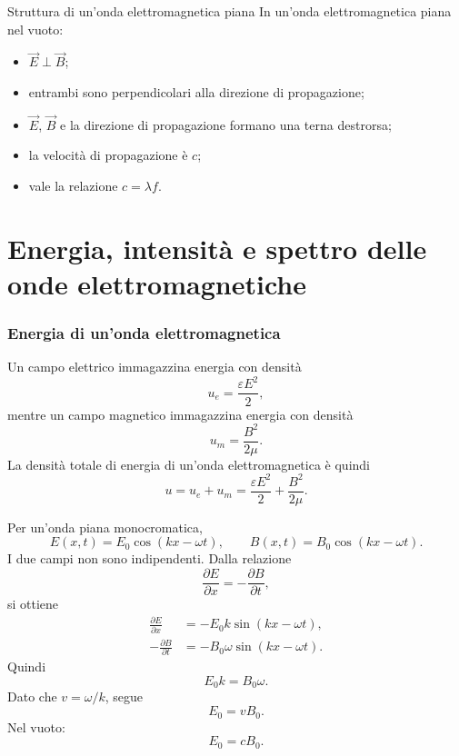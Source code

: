\documentclass[a4paper]{article}
\begin{document}
\begin{center}
\end{center}

\begin{snippetproposition}{Struttura di un'onda elettromagnetica piana}
In un'onda elettromagnetica piana nel vuoto:
\begin{itemize}
    \item \(\vec{E}\perp\vec{B}\);
    \item entrambi sono perpendicolari alla direzione di propagazione;
    \item \(\vec{E}\), \(\vec{B}\) e la direzione di propagazione formano una terna destrorsa;
    \item la velocità di propagazione è \(c\);
    \item vale la relazione \(c=\lambda f\).
\end{itemize}
\end{snippetproposition}

\pagebreak
\part{Energia, intensità e spettro delle onde elettromagnetiche}

\section{Energia di un'onda elettromagnetica}

Un campo elettrico immagazzina energia con densità
\[
u_e=\frac{\varepsilon E^2}{2},
\]
mentre un campo magnetico immagazzina energia con densità
\[
u_m=\frac{B^2}{2\mu}.
\]
La densità totale di energia di un'onda elettromagnetica è quindi
\[
u=u_e+u_m=\frac{\varepsilon E^2}{2}+\frac{B^2}{2\mu}.
\]

Per un'onda piana monocromatica,
\[
E(x,t)=E_0\cos(kx-\omega t),
\qquad
B(x,t)=B_0\cos(kx-\omega t).
\]
I due campi non sono indipendenti. Dalla relazione
\[
\frac{\partial E}{\partial x}=-\frac{\partial B}{\partial t},
\]
si ottiene
\begin{align*}
\frac{\partial E}{\partial x}
&=-E_0k\sin(kx-\omega t), \\
-\frac{\partial B}{\partial t}
&=-B_0\omega\sin(kx-\omega t).
\end{align*}
Quindi
\[
E_0k=B_0\omega.
\]
Dato che \(v=\omega/k\), segue
\[
E_0=vB_0.
\]
Nel vuoto:
\[
E_0=cB_0.
\]
\end{document}
